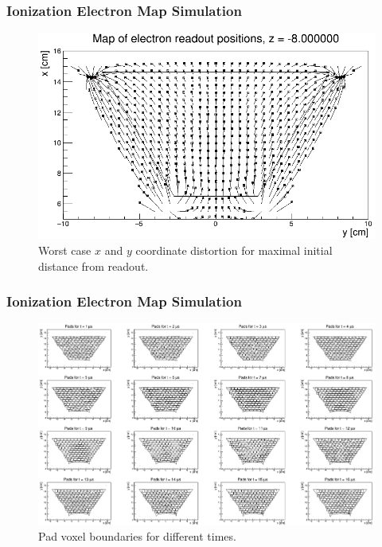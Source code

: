 \documentclass{beamer}
\begin{document}
	\begin{frame}
		\frametitle{Ionization Electron Map Simulation}
		\centering
		\begin{minipage}[c]{0.9\textwidth}
			\begin{figure}
				\centering
				\includegraphics[height=0.7\textheight]{../images/map_dist2_new.png}\\
				\small{Worst case $x$ and $y$ coordinate distortion for maximal initial distance from readout.}
			\end{figure}
		\end{minipage}
	\end{frame}
	\begin{frame}
		\frametitle{Ionization Electron Map Simulation}
		\begin{figure}
			\centering
			\includegraphics[height=0.68\textheight]{../images/pads_distortion.png}\\
			{Pad voxel boundaries for different times.}
		\end{figure}
	\end{frame}
\end{document}
